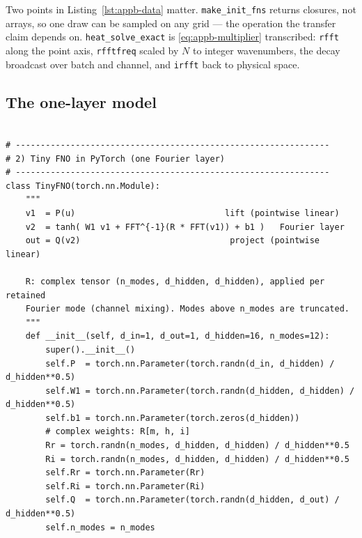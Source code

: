 Two points in Listing~\ref{lst:appb-data} matter. \texttt{make\_init\_fns} returns
closures, not arrays, so one draw can be sampled on any grid --- the operation the
transfer claim depends on. \texttt{heat\_solve\_exact} is \eqref{eq:appb-multiplier}
transcribed: \texttt{rfft} along the point axis, \texttt{rfftfreq} scaled by $N$ to
integer wavenumbers, the decay broadcast over batch and channel, and \texttt{irfft}
back to physical space.

\subsection{The one-layer model}

\begin{lstlisting}[style=appbpystyle, firstnumber=60, caption={\texttt{FNO Worked Example (PyTorch).py}, lines 60--104: \texttt{TinyFNO}, the pointwise lift, the single spectral layer with the complex weight held as two real tensors, and the pointwise projection. Printed verbatim; the inline shape comments are the script's own; the block opens on the reference file's blank line 60.}, label={lst:appb-model}]

# ---------------------------------------------------------------
# 2) Tiny FNO in PyTorch (one Fourier layer)
# ---------------------------------------------------------------
class TinyFNO(torch.nn.Module):
    """
    v1  = P(u)                              lift (pointwise linear)
    v2  = tanh( W1 v1 + FFT^{-1}(R * FFT(v1)) + b1 )   Fourier layer
    out = Q(v2)                              project (pointwise linear)

    R: complex tensor (n_modes, d_hidden, d_hidden), applied per retained
    Fourier mode (channel mixing). Modes above n_modes are truncated.
    """
    def __init__(self, d_in=1, d_out=1, d_hidden=16, n_modes=12):
        super().__init__()
        self.P  = torch.nn.Parameter(torch.randn(d_in, d_hidden) / d_hidden**0.5)
        self.W1 = torch.nn.Parameter(torch.randn(d_hidden, d_hidden) / d_hidden**0.5)
        self.b1 = torch.nn.Parameter(torch.zeros(d_hidden))
        # complex weights: R[m, h, i]
        Rr = torch.randn(n_modes, d_hidden, d_hidden) / d_hidden**0.5
        Ri = torch.randn(n_modes, d_hidden, d_hidden) / d_hidden**0.5
        self.Rr = torch.nn.Parameter(Rr)
        self.Ri = torch.nn.Parameter(Ri)
        self.Q  = torch.nn.Parameter(torch.randn(d_hidden, d_out) / d_hidden**0.5)
        self.n_modes = n_modes


\end{lstlisting}
